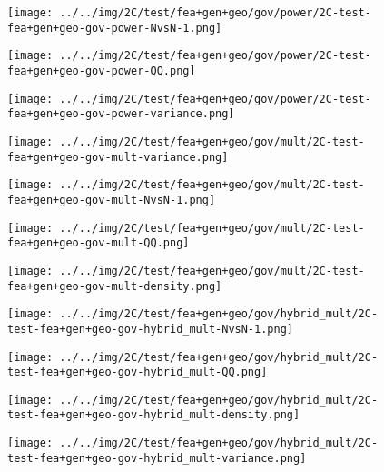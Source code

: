 \begin{figure}[H]
\centering	\texttt{[image: ../../img/2C/test/fea+gen+geo/gov/power/2C-test-fea+gen+geo-gov-power-NvsN-1.png]}
\end{figure}
\begin{figure}[H]
\centering	\texttt{[image: ../../img/2C/test/fea+gen+geo/gov/power/2C-test-fea+gen+geo-gov-power-QQ.png]}
\end{figure}
\begin{figure}[H]
\centering	\texttt{[image: ../../img/2C/test/fea+gen+geo/gov/power/2C-test-fea+gen+geo-gov-power-variance.png]}
\end{figure}
\begin{figure}[H]
\centering	\texttt{[image: ../../img/2C/test/fea+gen+geo/gov/mult/2C-test-fea+gen+geo-gov-mult-variance.png]}
\end{figure}
\begin{figure}[H]
\centering	\texttt{[image: ../../img/2C/test/fea+gen+geo/gov/mult/2C-test-fea+gen+geo-gov-mult-NvsN-1.png]}
\end{figure}
\begin{figure}[H]
\centering	\texttt{[image: ../../img/2C/test/fea+gen+geo/gov/mult/2C-test-fea+gen+geo-gov-mult-QQ.png]}
\end{figure}
\begin{figure}[H]
\centering	\texttt{[image: ../../img/2C/test/fea+gen+geo/gov/mult/2C-test-fea+gen+geo-gov-mult-density.png]}
\end{figure}
\begin{figure}[H]
\centering	\texttt{[image: ../../img/2C/test/fea+gen+geo/gov/hybrid\_mult/2C-test-fea+gen+geo-gov-hybrid\_mult-NvsN-1.png]}
\end{figure}
\begin{figure}[H]
\centering	\texttt{[image: ../../img/2C/test/fea+gen+geo/gov/hybrid\_mult/2C-test-fea+gen+geo-gov-hybrid\_mult-QQ.png]}
\end{figure}
\begin{figure}[H]
\centering	\texttt{[image: ../../img/2C/test/fea+gen+geo/gov/hybrid\_mult/2C-test-fea+gen+geo-gov-hybrid\_mult-density.png]}
\end{figure}
\begin{figure}[H]
\centering	\texttt{[image: ../../img/2C/test/fea+gen+geo/gov/hybrid\_mult/2C-test-fea+gen+geo-gov-hybrid\_mult-variance.png]}
\end{figure}
